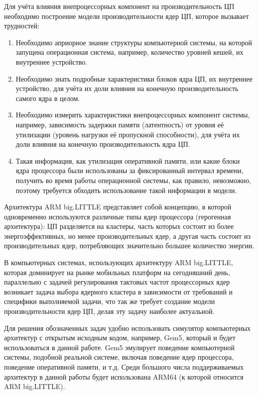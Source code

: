     Для учёта влияния внепроцессорных компонент на производительность ЦП необходимо построение
    модели производительности ядер ЦП, которое вызывает трудностей:
    \begin{enumerate}
        \item Необходимо априорное знание структуры компьютерной системы, на которой запущена
        операционная система, например, количество уровней кешей, их внутреннее устройство.
        \item Необходимо знать подробные характеристики блоков ядра ЦП, их внутреннее устройство, для
        учёта их доли влияния на конечную производительность самого ядра в целом.
        \item Необходимо измерить характеристики внепроцессорных компонент системы,
        например, зависимость задержки памяти (латентность) от уровня её утилизации (уровень
        нагрузки её пропускной способности), для учёта их доли влияния на конечную
        производительность ядра ЦП.
        \item Такая информация, как утилизация оперативной памяти, или какие блоки ядра процессора
        были использованы за фиксированный интервал времени, получить во время работы операционной
        системы, как правило, невозможно, поэтому требуется обходить использование такой информации
        в модели.
    \end{enumerate}

    Архитектура ARM big.LITTLE представляет собой концепцию, в которой одновременно
    используются различные типы ядер процессора (герогенная архитектура): ЦП разделяется на
    кластеры, часть которых состоит из более энергоэффективных, но менее производительных ядер,
    а другая часть состоит из производительных ядер, потребляющих значительно большее
    количество энергии.

    В компьютерных системах, использующих архитектуру ARM big.LITTLE, которая доминирует на рынке
    мобильных платформ на сегодняшний день, параллельно с задачей регулирования тактовых частот
    процессорных ядер возникает задача выбора ядерного кластера в зависимости от требований и
    специфики выполняемой задачи, что так же требует создание модели производительности ядер ЦП,
    делая эту задачу наиболее актуальной.

    Для решения обозначенных задач удобно использовать симулятор компьютерных
    архитектур с открытым исходным кодом, например, Gem5, который и будет использоваться в
    данной работе. Gem5 эмулирует поведение компьютерной системы, подобной реальной системе,
    включая поведение ядер процессора, поведение оперативной памяти, и т.д. Среди большого числа
    поддерживаемых архитектур в данной работы будет использована ARM64 (к которой относится
    ARM big.LITTLE).

